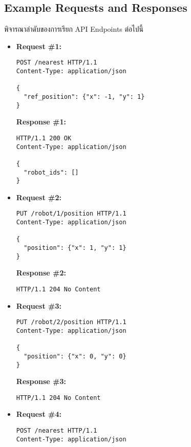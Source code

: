 \subsection{Example Requests and Responses}

\noindent
พิจารณาลำดับของการเรียก API Endpoints ต่อไปนี้

\begin{itemize}
\item  %
\textbf{Request \#1:}
\begin{lstlisting}[xleftmargin=1pc,numbers=none]
POST /nearest HTTP/1.1
Content-Type: application/json

{
  "ref_position": {"x": -1, "y": 1}
}
\end{lstlisting}
\textbf{Response \#1:}
\begin{lstlisting}[xleftmargin=1pc,numbers=none]
HTTP/1.1 200 OK
Content-Type: application/json

{
  "robot_ids": []
}
\end{lstlisting}

\newpage
\item  %
\textbf{Request \#2:}
\begin{lstlisting}[xleftmargin=1pc,numbers=none]
PUT /robot/1/position HTTP/1.1
Content-Type: application/json

{
  "position": {"x": 1, "y": 1}
}
\end{lstlisting}
\textbf{Response \#2:}
\begin{lstlisting}[xleftmargin=1pc,numbers=none]
HTTP/1.1 204 No Content
\end{lstlisting}

\item  %
\textbf{Request \#3:}
\begin{lstlisting}[xleftmargin=1pc,numbers=none]
PUT /robot/2/position HTTP/1.1
Content-Type: application/json

{
  "position": {"x": 0, "y": 0}
}
\end{lstlisting}
\textbf{Response \#3:}
\begin{lstlisting}[xleftmargin=1pc,numbers=none]
HTTP/1.1 204 No Content
\end{lstlisting}


\item  %
\textbf{Request \#4:}
\begin{lstlisting}[xleftmargin=1pc,numbers=none]
POST /nearest HTTP/1.1
Content-Type: application/json


\end{lstlisting}
\end{itemize}
